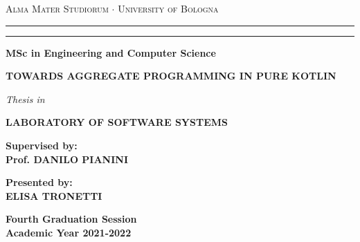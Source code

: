 \begin{titlepage}
    \begin{center}
    {{\Large{
        \textsc{Alma Mater Studiorum $\cdot$ University of Bologna}
    }}}
    \rule[0.1cm]{15.8cm}{0.1mm}
    \rule[0.5cm]{15.8cm}{0.6mm}
    {\small{\bf MSc in Engineering and Computer Science}}
    \vspace{41mm} %
    \end{center}
    \begin{center}
        \huge\bf TOWARDS AGGREGATE PROGRAMMING IN PURE KOTLIN
    \end{center}
    \vspace{41mm} %
    \begin{center}
    {{\emph{Thesis in}}}
    
    \vspace{1mm}
    {{\bf{LABORATORY OF SOFTWARE SYSTEMS}}}
    \vspace{18mm}
    \end{center}
    \par
    \noindent
    \begin{minipage}[t]{0.47\textwidth}
    {\large{\bf Supervised by:\\
    Prof. DANILO PIANINI}}
    \end{minipage}
    \hfill
    \begin{minipage}[t]{0.47\textwidth}\raggedleft
    {\large{\bf Presented by:\\
    ELISA TRONETTI}}
    \end{minipage}
    \vspace{20mm}
    \begin{center}
    {\large{\bf Fourth Graduation Session\\
    Academic Year 2021-2022}}
    \end{center}
\end{titlepage}
